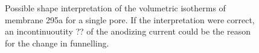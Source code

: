 \documentclass[../../thesis.tex]{subfiles}
\begin{document}
\begin{figure}[ht]
    \centering
    \caption{Possible shape interpretation of the volumetric isotherms of membrane 295a for a single pore. If the interpretation were correct, an incontinuoutity ?? of the anodizing current could be the reason for the change in funnelling.}
    \label{fig:weird_funnelling}
\end{figure}
\end{document}
